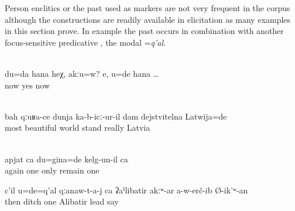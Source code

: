 Person enclitics or the past  used as  markers are not very frequent in the corpus although the constructions are readily available in elicitation as many examples in this section prove. In example  the past  occurs in combination with another focus-sensitive predicative , the modal  =\textit{q'al}.
%
\begin{exe}
	\\\label{ex:I am now her, right? Yes, YOU are now}%
	\gll	du=da	hana	heχ,	akːu=w? 	e,	u=de	hana	\ldots\\
			now			yes		now\\
	\glt	{}

	\\\label{ex:It was Latvia that seemed to me to be really the most beautiful country constituents}%
	\gll	bah	qːuʁa-ce	dunja	ka-b-icː-ur-il	dam	dejstvitelna	Latwija=de\\
		most	beautiful	world	stand		really Latvia\\
	\glt	{}

	\\\label{ex:Again it was me who remained alone@26a}%
	\gll	apjat	ca	du=gina=de	kelg-un-il	ca\\
		again	one	only	remain	one\\
	\glt	{}

	\ex	\label{ex:But you were the one who said that they had taken only Alibatir to the ditch@26b}
	\gll	c'il	u=de=q'al	qːanaw-t-a-j	ca	ʡaˁlibatir 	akːʷ-ar		a-w-erč-ib 	Ø-ik'ʷ-an\\
		then		ditch	one	Alibatir 		lead	say\\
	\glt	{} 
\end{exe}

